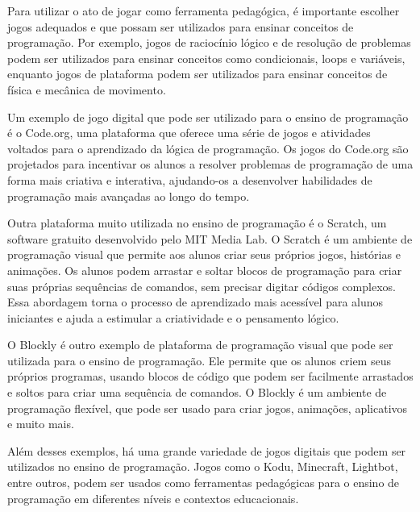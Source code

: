 Para utilizar o ato de jogar como ferramenta pedagógica, é importante escolher jogos adequados e que possam ser utilizados para ensinar conceitos de programação. Por exemplo, jogos de raciocínio lógico e de resolução de problemas podem ser utilizados para ensinar conceitos como condicionais, loops e variáveis, enquanto jogos de plataforma podem ser utilizados para ensinar conceitos de física e mecânica de movimento.

Um exemplo de jogo digital que pode ser utilizado para o ensino de programação é o Code.org, uma plataforma que oferece uma série de jogos e atividades voltados para o aprendizado da lógica de programação. Os jogos do Code.org são projetados para incentivar os alunos a resolver problemas de programação de uma forma mais criativa e interativa, ajudando-os a desenvolver habilidades de programação mais avançadas ao longo do tempo.

Outra plataforma muito utilizada no ensino de programação é o Scratch, um software gratuito desenvolvido pelo MIT Media Lab. O Scratch é um ambiente de programação visual que permite aos alunos criar seus próprios jogos, histórias e animações. Os alunos podem arrastar e soltar blocos de programação para criar suas próprias sequências de comandos, sem precisar digitar códigos complexos. Essa abordagem torna o processo de aprendizado mais acessível para alunos iniciantes e ajuda a estimular a criatividade e o pensamento lógico.

O Blockly é outro exemplo de plataforma de programação visual que pode ser utilizada para o ensino de programação. Ele permite que os alunos criem seus próprios programas, usando blocos de código que podem ser facilmente arrastados e soltos para criar uma sequência de comandos. O Blockly é um ambiente de programação flexível, que pode ser usado para criar jogos, animações, aplicativos e muito mais.


Além desses exemplos, há uma grande variedade de jogos digitais que podem ser utilizados no ensino de programação. Jogos como o Kodu, Minecraft, Lightbot, entre outros, podem ser usados como ferramentas pedagógicas para o ensino de programação em diferentes níveis e contextos educacionais.

